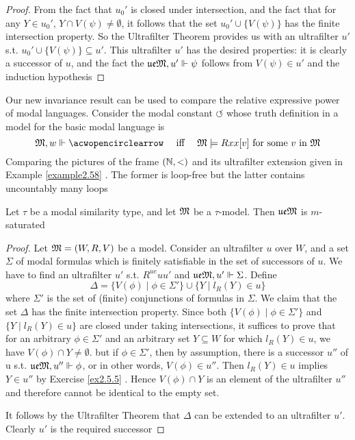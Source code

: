 \documentclass[11pt]{article}
\newcommand{\ue}{\fu\fe}
\begin{document}
\begin{proof}
From the fact that \(u_0'\) is closed under intersection, and the fact that
for any \(Y\in u_0'\), \(Y\cap V(\psi)\neq\emptyset\), it follows that the set
\(u_0'\cup\{V(\psi)\}\) has the finite intersection property. So the
Ultrafilter Theorem provides us with an ultrafilter \(u'\) s.t.
\(u_0'\cup\{V(\psi)\}\subseteq u'\). This ultrafilter \(u'\) has the desired
properties: it is clearly a successor of \(u\), and the fact the
\(\ue\fM,u'\Vdash\psi\) follows from \(V(\psi)\in u'\) and the induction hypothesis
\end{proof}

\begin{examplle}[]
Our new invariance result can be used to compare the relative expressive
power of modal languages. Consider the modal constant
\(\acwopencirclearrow\) whose truth definition in a model for the basic
modal language is
\begin{equation*}
\fM,w\Vdash\acwopencirclearrow \quad\text{ iff }\quad
\fM\models Rxx[v]\text{ for some $v$ in }\fM
\end{equation*}
Comparing the pictures of the frame \((\mathbb{N},<)\) and its ultrafilter extension
given in Example \ref{example2.58} . The former is loop-free but the latter
contains uncountably many loops
\end{examplle}


\begin{proposition}[]
\label{prop2.61}
Let \(\tau\) be a modal similarity type, and let \(\mathfrak{M}\) be a \(\tau\)-model. Then
\(\ue\fM\) is \(m\)-saturated
\end{proposition}

\begin{proof}
Let \(\mathfrak{M}=(W,R,V)\) be a model. Consider an ultrafilter \(u\) over \(W\),
and a set \(\Sigma\) of modal formulas which is finitely satisfiable in the set of
successors of \(u\). We have to find an ultrafilter \(u'\) s.t.
\(R^{ue}uu'\) and \(\ue\fM,u'\Vdash\Sigma\). Define
\begin{equation*}
\Delta=\{V(\phi)\mid\phi\in\Sigma'\}\cup\{Y\mid l_R(Y)\in u\}
\end{equation*}
where \(\Sigma'\) is the set of (finite) conjunctions of formulas in \(\Sigma\). We
claim that the set \(\Delta\) has the finite intersection property. Since both
\(\{V(\phi)\mid\phi\in\Sigma'\}\) and \(\{Y\mid l_R(Y)\in u\}\) are closed
under taking intersections, it suffices to prove that for an arbitrary
\(\phi\in\Sigma'\) and an arbitrary set \(Y\subseteq W\) for which
\(l_R(Y)\in u\), we have \(V(\phi)\cap Y\neq\emptyset\). but if
\(\phi\in\Sigma'\), then by assumption, there is a successor \(u''\) of u
s.t. \(\ue\fM,u''\Vdash\phi\), or in other words, \(V(\phi)\in u''\). Then
\(l_R(Y)\in u\) implies \(Y\in u''\) by Exercise \ref{ex2.5.5} . Hence
\(V(\phi)\cap Y\) is an element of the ultrafilter \(u''\) and therefore cannot
be identical to the empty set.

It follows by the Ultrafilter Theorem that \(\Delta\) can be extended to an
ultrafilter \(u'\). Clearly \(u'\) is the required successor
\end{proof}
\end{document}
